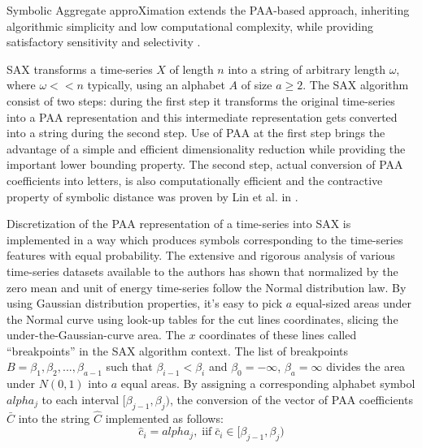 \documentclass[conference]{worldcomp}
\begin{document}
Symbolic Aggregate approXimation extends the PAA-based approach, inheriting algorithmic 
simplicity and low computational complexity, while providing satisfactory sensitivity and 
selectivity \cite{citeulike:2821475}. 

SAX transforms a time-series $X$ of length $n$ into a string of arbitrary length $\omega$, 
where $\omega << n$ typically, using an alphabet $A$ of size $ a \geq 2$. 
The SAX algorithm consist of two steps: during the first step it transforms the original time-series 
into a PAA representation and this intermediate representation gets converted into a string during the second step. 
Use of PAA at the first step brings the advantage of a simple and efficient dimensionality reduction while 
providing the important lower bounding property. 
The second step, actual conversion of PAA coefficients into letters, is also computationally efficient 
and the contractive property of symbolic distance was proven by Lin et al. in \cite{citeulike:532335}.

Discretization of the PAA representation of a time-series into SAX is implemented in a way which produces 
symbols corresponding to the time-series features with equal probability. The extensive and rigorous 
analysis of various time-series datasets available to the authors has shown that normalized by the zero 
mean and unit of energy time-series follow the Normal distribution law. By using Gaussian distribution 
properties, it's easy to pick $a$ equal-sized areas under the Normal curve using  look-up tables \cite{citeulike:4434481} 
for the cut lines coordinates, slicing the under-the-Gaussian-curve area. 
The $x$ coordinates of these lines called ``breakpoints'' in the SAX algorithm context. The 
list of breakpoints $B=\beta_{1}, \beta_{2}, ... , \beta_{a-1}$ such that 
$\beta_{i-1} < \beta_{i}$ and $\beta_{0} = -\infty$, $\beta_{a} = \infty$ 
divides the area under $N(0,1)$ into $a$ equal areas. 
By assigning a corresponding alphabet symbol $alpha_{j}$ to each interval $[\beta_{j-1},\beta_{j})$, 
the conversion of the vector of PAA coefficients $\bar{C}$ into the string $\hat{C}$ implemented as follows:
\begin{equation}
\hat{c}_{i} = alpha_{j}, \; \text{iif} \; \bar{c}_{i} \in [\beta_{j-1},\beta_{j})
\label{eq:alpha}
\end{equation}

\end{document}
